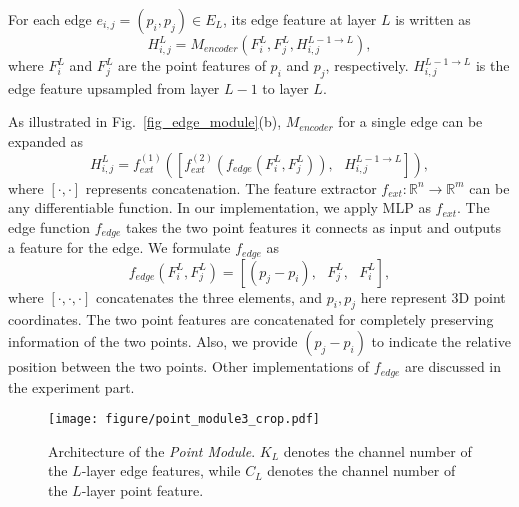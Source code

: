 \documentclass[10pt,twocolumn,letterpaper]{article}
\begin{document}
For each edge $e_{i, j} = (p_i, p_j) \in E_L$, its edge feature at layer $L$ is written as
\begin{equation}
H_{i, j}^{L} = M_{encoder}(F_i^{L}, F_j^{L}, H_{i, j}^{L-1\to L}),
\end{equation}
where $F_i^{L}$ and $F_j^{L}$ are the point features of $p_i$ and $p_j$, respectively.
$H_{i, j}^{L-1\to L}$ is the edge feature upsampled from layer $L-1$ to layer $L$.

As illustrated in Fig.~\ref{fig_edge_module}(b),  $M_{encoder}$ for a single edge can be expanded as
\begin{equation} 
H_{i, j}^{L} = f_{ext}^{(1)}([f_{ext}^{(2)}(f_{edge}(F_i^{L}, F_j^{L})), \text{ }H_{i, j}^{L-1\to L}]),
\end{equation}
where $[\cdot, \cdot]$ represents concatenation.
The feature extractor $f_{ext} : \mathbb{R}^{n} \to \mathbb{R}^{m}$ can be any differentiable function. In our implementation, we apply MLP as $f_{ext}$. The edge function $f_{edge} $ takes the two point features it connects as input and outputs a feature for the edge. We formulate $f_{edge}$ as 
\begin{equation}
f_{edge}(F_i^{L}, F_j^{L}) =   [(p_j - p_i),\text{ } F_j^{L},\text{ }  F_i^{L}] ,
\end{equation}
where $[\cdot, \cdot, \cdot]$ concatenates the three elements, and $p_i, p_j$ here represent 3D point coordinates. The two point features are concatenated for completely preserving information of the two points. Also, we provide $(p_j - p_i)$ to indicate the relative position between the two points. Other implementations of $f_{edge}$ are discussed in the experiment part.

\begin{figure}
	\begin{center}
		\texttt{[image: figure/point\_module3\_crop.pdf]}
	\end{center}
	\caption{Architecture of the \textit{Point Module}. $K_L$ denotes the channel number of the $L$-layer edge features, while $C_L$ denotes the channel number of the $L$-layer point feature.}
	\vspace{-2mm}
	\label{fig_point_module}
\end{figure}
\end{document}

